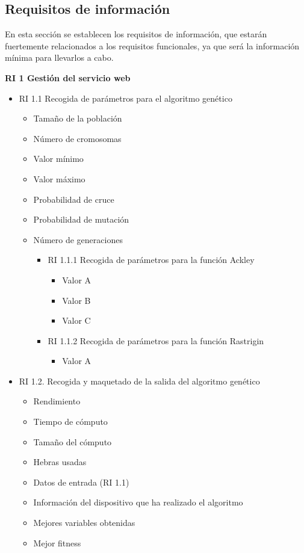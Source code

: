 \subsection{Requisitos de información}

\bigskip
En esta sección se establecen los requisitos de información, que estarán fuertemente relacionados a los requisitos funcionales, ya que será la información mínima para llevarlos a cabo.

\bigskip
\textbf{RI 1 Gestión del servicio web}

\begin{itemize}
	\item RI 1.1 Recogida de parámetros para el algoritmo genético

	\begin{itemize}
		\item Tamaño de la población
		\item Número de cromosomas
		\item Valor mínimo
		\item Valor máximo
		\item Probabilidad de cruce
		\item Probabilidad de mutación
		\item Número de generaciones
			\begin{itemize}
				\item RI 1.1.1 Recogida de parámetros para la función Ackley
				\begin{itemize}
					\item Valor A
					\item Valor B
					\item Valor C
				\end{itemize}
				
				\item RI 1.1.2 Recogida de parámetros para la función Rastrigin
				\begin{itemize}
					\item Valor A
				\end{itemize}
			\end{itemize}
	\end{itemize}

	\item RI 1.2. Recogida y maquetado de la salida del algoritmo genético
	\begin{itemize}
		\item Rendimiento
		\item Tiempo de cómputo
		\item Tamaño del cómputo
		\item Hebras usadas
		\item Datos de entrada (RI 1.1)
		\item Información del dispositivo que ha realizado el algoritmo
		\item Mejores variables obtenidas
		\item Mejor fitness
	\end{itemize}
	
\end{itemize}



